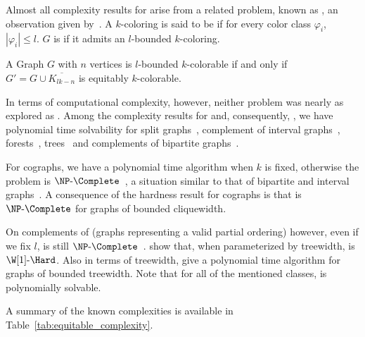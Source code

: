 Almost all complexity results for  arise from a related problem, known as , an observation given by~\citep{equitable_treewidth}.
A $k$-coloring is said to be  if for every color class $\varphi_i$, $|\varphi_i| \leq l$.
$G$ is  if it admits an $l$-bounded $k$-coloring.


\begin{observation*}
    A Graph $G$ with $n$ vertices is $l$-bounded $k$-colorable if and only if $G' = G \cup \overline{K_{lk - n}}$ is equitably $k$-colorable.
\end{observation*}


In terms of computational complexity, however, neither problem was nearly as explored as .
Among the complexity results for  and, consequently, , we have polynomial time solvability for split graphs~\citep{equitable_split}, complement of interval graphs~\citep{graph_partitioning1}, forests~\citep{mutual_exclusion_scheduling}, trees~\citep{equitable_trees} and complements of bipartite graphs~\citep{graph_partitioning1}.

For cographs, we have a polynomial time algorithm when $k$ is fixed, otherwise the problem is $\NPc$~\citep{graph_partitioning1}, a situation similar to that of bipartite and interval graphs~\citep{graph_partitioning1}.
A consequence of the hardness result for cographs is that  is $\NPc$ for graphs of bounded cliquewidth.

On complements of  (graphs representing a valid partial ordering) however, even if we fix $l$,  is still $\NPc$~\citep{chain_antichain}.
\citep{colorful_treewidth} show that, when parameterized by treewidth,  is $\W[1]\text{-}\Hard$.
Also in terms of treewidth, \citep{equitable_treewidth} give a polynomial time algorithm for graphs of bounded treewidth.
Note that for all of the mentioned classes,  is polynomially solvable.

A summary of the known complexities is available in Table~\ref{tab:equitable_complexity}.


